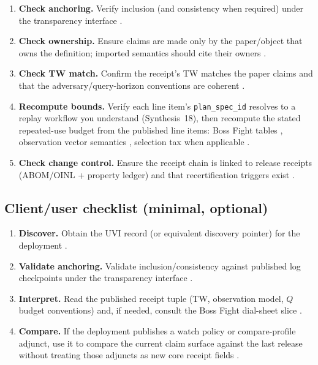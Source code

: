 \documentclass[11pt]{article}
\begin{document}
\begin{enumerate}[leftmargin=*]
\item \textbf{Check anchoring.} Verify inclusion (and consistency when required) under the transparency interface \cite{series:transparency}.
\item \textbf{Check ownership.} Ensure claims are made only by the paper/object that owns the definition; imported semantics should cite their owners \cite{series:contractobjects}.
\item \textbf{Check TW match.} Confirm the receipt's TW matches the paper claims and that the adversary/query-horizon conventions are coherent \cite{series:threatwindows}.
\item \textbf{Recompute bounds.} Verify each line item's \texttt{plan\_spec\_id} resolves to a replay workflow you understand (Synthesis~18), then recompute the stated repeated-use budget from the published line items:
Boss Fight tables \cite{series:bossfightdial}, observation vector semantics \cite{series:tieredobsvec}, selection tax when applicable \cite{series:selectiontax}.
\item \textbf{Check change control.} Ensure the receipt chain is linked to release receipts (ABOM/OINL + property ledger) \cite{series:releaseledger,series:abomoinl} and that recertification triggers exist \cite{series:advantagecontracts}.
\end{enumerate}

\subsection{Client/user checklist (minimal, optional)}

\begin{enumerate}[leftmargin=*]
\item \textbf{Discover.} Obtain the UVI record (or equivalent discovery pointer) for the deployment \cite{series:userminiface}.
\item \textbf{Validate anchoring.} Validate inclusion/consistency against published log checkpoints under the transparency interface \cite{series:transparency}.
\item \textbf{Interpret.} Read the published receipt tuple (TW, observation model, $Q$ budget conventions) \cite{series:receiptitems} and, if needed, consult the Boss Fight dial-sheet slice \cite{series:bossfightdial}.
\item \textbf{Compare.} If the deployment publishes a watch policy or compare-profile adjunct, use it to compare the current claim surface against the last release without treating those adjuncts as new core receipt fields \cite{series:workedexample}.
\end{enumerate}
\end{document}
